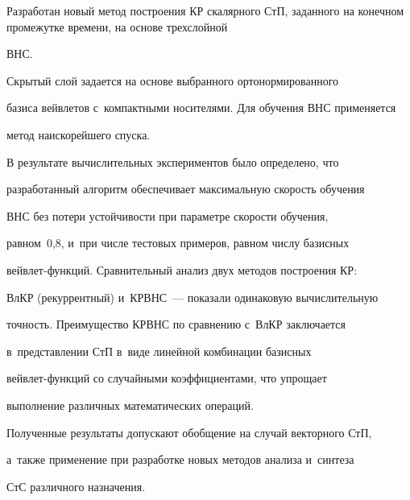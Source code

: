   


  Разработан новый метод построения КР скалярного СтП, заданного на конечном промежутке времени, на основе трехслойной 


ВНС.


 Скрытый слой задается на основе выбранного ортонормированного 


базиса вейв\-ле\-тов с~компактными носителями. Для обучения ВНС применяется 


метод наискорейшего спуска. 








  


  В результате вычислительных экспериментов было определено, что 


разработанный алгоритм обеспечивает максимальную ско\-рость обуче\-ния 


ВНС без потери устойчивости при параметре ско\-рости обуче\-ния,  


рав\-ном~0,8, и~при числе тестовых примеров, равном чис\-лу базисных  


вейв\-лет-функ\-ций. Сравнительный анализ двух методов построения КР: 


ВлКР (рекуррентный) и~КРВНС~--- показали одинаковую вычислительную 


точ\-ность. Преимущество КРВНС по сравнению с~ВлКР заключается 


в~представлении СтП в~виде линейной комбинации базисных  


вейв\-лет-функ\-ций со случайными коэффициентами, что упрощает 


выполнение различных математических операций. 


  


  Полученные результаты допускают обобщение на случай векторного СтП, 


а~также применение при разработке новых методов анализа и~синтеза 


СтС различного назначения. 


  



